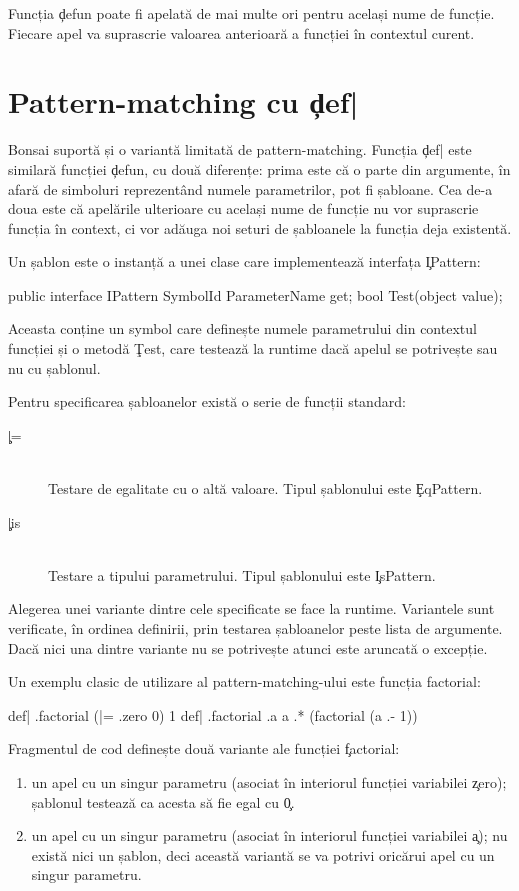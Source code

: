 \documentclass[12pt,a4paper]{memoir}
\begin{document}
Funcția \c{defun} poate fi apelată de mai multe ori pentru același nume de funcție. Fiecare apel va suprascrie valoarea anterioară a funcției în contextul curent.

\section{Pattern-matching cu \c{def|}}

Bonsai suportă și o variantă limitată de pattern-matching. Funcția \c{def|} este similară funcției \c{defun}, cu două diferențe:
prima este că o parte din argumente, în afară de simboluri reprezentând numele parametrilor, pot fi șabloane. Cea de-a doua este că apelările ulterioare cu același nume de funcție nu vor suprascrie funcția în context, ci vor adăuga noi seturi de șabloanele la funcția deja existentă.

Un șablon este o instanță a unei clase care implementează interfața \c{IPattern}:
\begin{code}
public interface IPattern {
  SymbolId ParameterName { get; }
  bool Test(object value);
}
\end{code}
Aceasta conține un symbol care definește numele parametrului din contextul funcției și o metodă \c{Test}, care testează la runtime dacă apelul se potrivește sau nu cu șablonul.

Pentru specificarea șabloanelor există o serie de funcții standard:
\begin{description}
\item[\c{|=}]\hfill\\ Testare de egalitate cu o altă valoare. Tipul șablonului este \c{EqPattern}.
\item[\c{|is}]\hfill\\ Testare a tipului parametrului. Tipul șablonului este \c{IsPattern}.
\end{description}

Alegerea unei variante dintre cele specificate se face la runtime. Variantele sunt verificate, în ordinea definirii, prin testarea șabloanelor peste lista de argumente. Dacă nici una dintre variante nu se potrivește atunci este aruncată o excepție.

Un exemplu clasic de utilizare al pattern-matching-ului este funcția factorial:
\begin{code}
def| .factorial (|= .zero 0) { 1 }
def| .factorial .a { a .* (factorial (a .- 1)) }
\end{code}
Fragmentul de cod definește două variante ale funcției \c{factorial}:
\begin{enumerate}
\item un apel cu un singur parametru (asociat în interiorul funcției variabilei \c{zero}); șablonul testează ca acesta să fie egal cu \c{0}.
\item un apel cu un singur parametru (asociat în interiorul funcției variabilei \c{a}); nu există nici un șablon, deci această variantă se va potrivi oricărui apel cu un singur parametru.
\end{enumerate}
\end{document}
